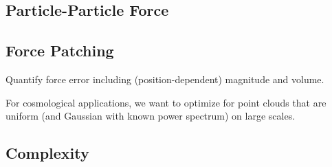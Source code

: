\documentclass[a4paper]{article}
\newcommand{\1}{\mathds{1}}
\newcommand{\YL}[1]{\textcolor{Bittersweet}{#1}}
\begin{document}


\subsection{Particle-Particle Force}



\subsection{Force Patching}


\YL{Quantify force error including (position-dependent) magnitude and
volume.}


For cosmological applications, we want to optimize for point clouds that
are uniform (and Gaussian with known power spectrum) on large scales.


\subsection{Complexity}
\end{document}
